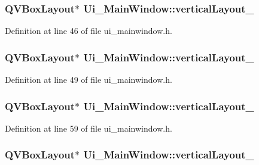 \subsubsection[{vertical\+Layout\+\_\+3}]{\setlength{\rightskip}{0pt plus 5cm}Q\+V\+Box\+Layout$\ast$ Ui\+\_\+\+Main\+Window\+::vertical\+Layout\+\_}\label{class_ui___main_window_a38b8a4b887f3b58e2a49e7905ae6f1f0}


Definition at line 46 of file ui\+\_\+mainwindow.\+h.

\hypertarget{class_ui___main_window_a6f40fc110b15410c00837a446d57bdbe}{}
\subsubsection[{vertical\+Layout\+\_\+4}]{\setlength{\rightskip}{0pt plus 5cm}Q\+V\+Box\+Layout$\ast$ Ui\+\_\+\+Main\+Window\+::vertical\+Layout\+\_}\label{class_ui___main_window_a6f40fc110b15410c00837a446d57bdbe}


Definition at line 49 of file ui\+\_\+mainwindow.\+h.

\hypertarget{class_ui___main_window_afcc20a3d5058037a00cdc6122f231848}{}
\subsubsection[{vertical\+Layout\+\_\+5}]{\setlength{\rightskip}{0pt plus 5cm}Q\+V\+Box\+Layout$\ast$ Ui\+\_\+\+Main\+Window\+::vertical\+Layout\+\_}\label{class_ui___main_window_afcc20a3d5058037a00cdc6122f231848}


Definition at line 59 of file ui\+\_\+mainwindow.\+h.

\hypertarget{class_ui___main_window_a93c190b085c63a667c535ba0bbcfec7c}{}
\subsubsection[{vertical\+Layout\+\_\+6}]{\setlength{\rightskip}{0pt plus 5cm}Q\+V\+Box\+Layout$\ast$ Ui\+\_\+\+Main\+Window\+::vertical\+Layout\+\_}\label{class_ui___main_window_a93c190b085c63a667c535ba0bbcfec7c}


